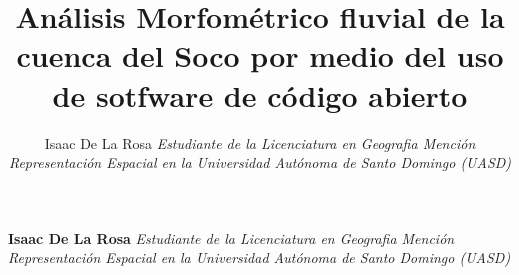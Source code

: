 \documentclass[11pt,]{article}
\title{Análisis Morfométrico fluvial de la cuenca del Soco por medio del uso de
sotfware de código abierto  }
\author{\Large Isaac De La Rosa\vspace{0.05in} \newline\normalsize\emph{Estudiante de la Licenciatura en Geografia Mención Representación
Espacial en la Universidad Autónoma de Santo Domingo (UASD)}  }
\date{}
\newcommand*{\authorfont}{\fontfamily{phv}\selectfont}
\begin{document}
	
%

{%
\setlength{\parindent}{0pt}
\thispagestyle{plain}
{\fontsize{18}{20}\selectfont\raggedright 
\maketitle  %

}

{
   \vskip 13.5pt\relax \normalsize\fontsize{11}{12} 
\textbf{\authorfont Isaac De La Rosa} \hskip 15pt \emph{\small Estudiante de la Licenciatura en Geografia Mención Representación
Espacial en la Universidad Autónoma de Santo Domingo (UASD)}   

}

}
\end{document}
